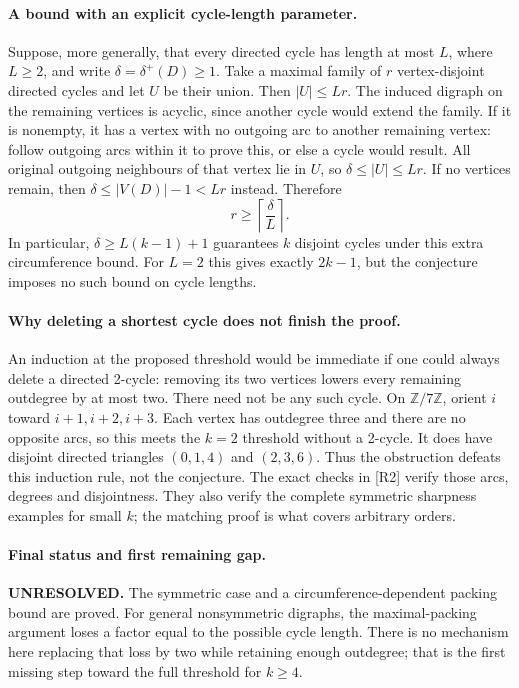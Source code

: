 \documentclass[11pt,a4paper]{article}
\begin{document}
\paragraph{A bound with an explicit cycle-length parameter.}
Suppose, more generally, that every directed cycle has length at most
$L$, where $L\ge2$, and write $\delta=\delta^+(D)\ge1$.
Take a maximal family of $r$ vertex-disjoint directed cycles and let
$U$ be their union. Then $|U|\le Lr$. The induced digraph on the
remaining vertices is acyclic, since another cycle would extend the
family. If it is nonempty, it has a vertex with no outgoing arc to
another remaining vertex: follow outgoing arcs within it to prove this,
or else a cycle would result. All original outgoing neighbours of
that vertex lie in $U$, so $\delta\le |U|\le Lr$.
If no vertices remain, then $\delta\le |V(D)|-1<Lr$ instead. Therefore
\[
                  r\ge\left\lceil\frac{\delta}{L}\right\rceil.
\]
In particular, $\delta\ge L(k-1)+1$ guarantees $k$ disjoint cycles
under this extra circumference bound. For $L=2$ this gives exactly
$2k-1$, but the conjecture imposes no such bound on cycle lengths.

\paragraph{Why deleting a shortest cycle does not finish the proof.}
An induction at the proposed threshold would be immediate if one
could always delete a directed 2-cycle: removing its two vertices
lowers every remaining outdegree by at most two. There need not be
any such cycle. On $\mathbb Z/7\mathbb Z$, orient $i$ toward
$i+1,i+2,i+3$. Each vertex has outdegree three and there are no
opposite arcs, so this meets the $k=2$ threshold without a 2-cycle.
It does have disjoint directed triangles $(0,1,4)$ and $(2,3,6)$.
Thus the obstruction defeats this induction rule, not the conjecture.
The exact checks in [R2] verify those arcs, degrees and disjointness.
They also verify the complete symmetric sharpness examples for small
$k$; the matching proof is what covers arbitrary orders.

\paragraph{Final status and first remaining gap.}
\textbf{UNRESOLVED.} The symmetric case and a circumference-dependent
packing bound are proved. For general nonsymmetric digraphs, the
maximal-packing argument loses a factor equal to the possible cycle
length. There is no mechanism here replacing that loss by two while
retaining enough outdegree; that is the first missing step toward the
full threshold for $k\ge4$.
\end{document}

